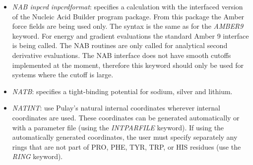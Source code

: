 \documentclass[12pt,a4paper,dvips]{article}
\begin{document}
\begin{itemize}
An input file {\tt multipotconfig} is used to specify which potential functions are to be used and
which atoms use each potential. For each type of potential in the system, {\tt multipotconfig} should 
contain the following:

\vspace{0.5cm}

{ \it POT }

{ \it POTTYPE n scale nparams } 

{ \it [params] }

followed by a list of atom indices which will use this potential (the format of the list will depend 
on the particular potential). 

\vspace{0.5cm}

{ \it POTTYPE } is a string identifier for the type of potential being used,
{ \it n } is the number of atoms using this potential and { \it scale } is the energy unit for this potential
(which should be set to 1.0 for at least one potential). { \it nparams} is the number of potential-specific
parameters which are required, and { \it [params] } is a list of these parameters.

Be aware that using {\it MULTIPOT} will give a slight performance hit, because of the several function calls and bookkeeping that
is associated with each call to {\it POTENTIAL}. This scheme is intended for playing around with composite potentials, for systems which are small enough that performance is not a big issue, or for systems involving many different potential functions which will be much too fiddly to hard-code a single subroutine.

\item {\it NAB inpcrd inpcrdformat\/}: specifies a calculation with the interfaced
version of the Nucleic Acid Builder program package. From this package the Amber force fields
are being used only. The syntax is the same as for the {\it AMBER9} keyword. For energy 
and gradient evaluations the standard Amber 9 interface is being called. The NAB routines 
are only called for analytical second derivative evaluations. The NAB interface does not 
have smooth cutoffs implemented at the moment, therefore this keyword should only be used 
for systems where the cutoff is large. 

\item {\it NATB\/}: specifies a tight-binding potential for sodium, silver and lithium.

\item {\it NATINT\/}: use Pulay's natural internal coordinates\cite{PulayFPB79, FogarasiZTP92}
  wherever internal coordinates are used. These coordinates can be generated
  automatically or with a parameter file (using the {\it INTPARFILE}
  keyword). If using the automatically generated coordinates, the user must
  specify separately any rings that are not part of PRO, PHE, TYR, TRP, or HIS
  residues (use the {\it RING} keyword).


\end{itemize}
\end{document}
